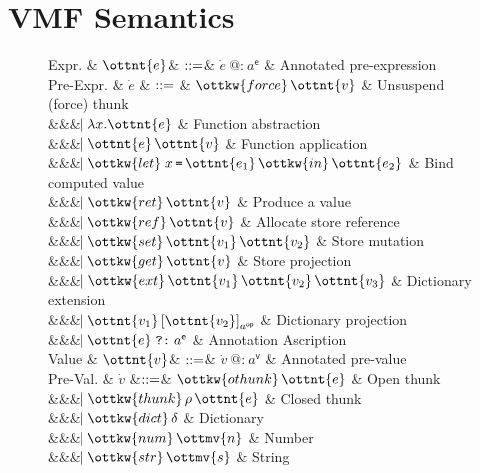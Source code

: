 \section{VMF Semantics}

\begin{figure}
\begin{grammar}
  Expr.     & $\ottnt{e}$& $\mathrel{::=}$& $ \dot{e} ~\texttt{@:}~ a^\textsf{e} $ & Annotated pre-expression
  \\
  Pre-Expr. & $\dot{e}$ & $\mathrel{::=}$ & $\ottkw{force} \, \ottnt{v}$ & Unsuspend (force) thunk
  \\ &&& $\bnfaltbrk  \lambda  x .  \ottnt{e} $ & Function abstraction
  \\ &&& $\bnfaltbrk \ottnt{e} \, \ottnt{v}$ & Function application
  \\ &&& $\bnfaltbrk  \ottkw{let} \; x \,{\texttt{=} }\, \ottnt{e_{{\mathrm{1}}}} \, \ottkw{in} \, \ottnt{e_{{\mathrm{2}}}} $ & Bind computed value
  \\ &&& $\bnfaltbrk \ottkw{ret} \, \ottnt{v}$ & Produce a value
  \\ &&& $\bnfaltbrk \ottkw{ref} \, \ottnt{v}$ & Allocate store reference
  \\ &&& $\bnfaltbrk \ottkw{set} \, \ottnt{v_{{\mathrm{1}}}} \, \ottnt{v_{{\mathrm{2}}}}$ & Store mutation
  \\ &&& $\bnfaltbrk \ottkw{get} \, \ottnt{v}$ & Store projection
  \\ &&& $\bnfaltbrk \ottkw{ext} \, \ottnt{v_{{\mathrm{1}}}} \, \ottnt{v_{{\mathrm{2}}}} \, \ottnt{v_{{\mathrm{3}}}}$ & Dictionary extension
  \\ &&& $\bnfaltbrk  \ottnt{v_{{\mathrm{1}}}} \left[  \ottnt{v_{{\mathrm{2}}}}  \right]_{ a^{\textsf{op} } } $ & Dictionary projection
  \\ &&& $\bnfaltbrk \ottnt{e}  \mathrel{ \texttt{?:} }  a^\textsf{e}$ & Annotation Ascription
  \\[2px]
  Value    & $\ottnt{v}$& $\mathrel{::=}$& $ \dot{v} ~\texttt{@:}~ a^\textsf{v} $ & Annotated pre-value
  \\
  Pre-Val. & $\dot{v}$ 
  &$\mathrel{::=}$&        $\ottkw{othunk} \, \ottnt{e}$    & Open thunk
  \\ &&& $\bnfaltbrk \ottkw{thunk} \, \rho \, \ottnt{e}$ & Closed thunk
  \\ &&& $\bnfaltbrk \ottkw{dict} \, \delta$  & Dictionary
  \\ &&& $\bnfaltbrk \ottkw{num} \, \ottmv{n}$ & Number
  \\ &&& $\bnfaltbrk \ottkw{str} \, \ottmv{s}$ & String

\end{grammar}
\end{figure}
